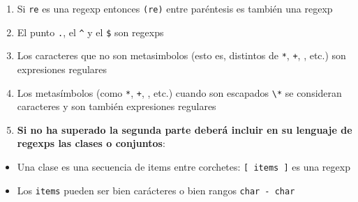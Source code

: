 \begin{enumerate}
\def\labelenumi{\arabic{enumi}.}
\setcounter{enumi}{3}
\itemsep1pt\parskip0pt
\item
  Si \texttt{re} es una regexp entonces \texttt{(re)} entre paréntesis
  es también una regexp
\item
  El punto \texttt{\textquotesingle{}.\textquotesingle{}}, el
  \texttt{\textquotesingle{}\^{}\textquotesingle{}} y el
  \texttt{\textquotesingle{}\$\textquotesingle{}} son regexps
\item
  Los caracteres que no son metasimbolos (esto es, distintos de
  \texttt{\textquotesingle{}*\textquotesingle{}},
  \texttt{\textquotesingle{}+\textquotesingle{}},
  \texttt{\textquotesingle{}\textbar{}\textquotesingle{}}, etc.) son
  expresiones regulares
\item
  Los metasímbolos (como \texttt{\textquotesingle{}*\textquotesingle{}},
  \texttt{\textquotesingle{}+\textquotesingle{}},
  \texttt{\textquotesingle{}\textbar{}\textquotesingle{}}, etc.) cuando
  son escapados
  \texttt{\textquotesingle{}\textbackslash{}*\textquotesingle{}} se
  consideran caracteres y son también expresiones regulares
\item
  \textbf{Si no ha superado la segunda parte deberá incluir en su
  lenguaje de regexps las clases o conjuntos}:
\end{enumerate}

\begin{itemize}
\itemsep1pt\parskip0pt
\item
  Una clase es una secuencia de items entre corchetes:
  \texttt{{[} items {]}} es una regexp
\item
  Los \texttt{items} pueden ser bien carácteres o bien rangos
  \texttt{char - char}
\end{itemize}
